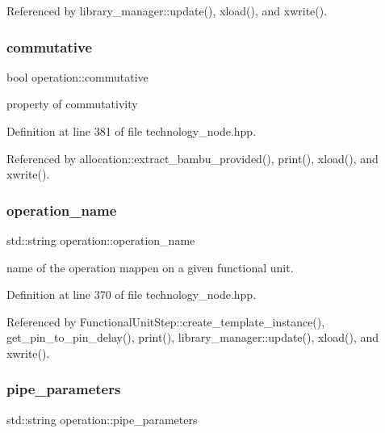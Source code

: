 Referenced by library\+\_\+manager\+::update(), xload(), and xwrite().

\mbox{\label{structoperation_aa872c8588602ccb6d412b9d164eef46c}} 
\subsubsection{\texorpdfstring{commutative}{commutative}}
{\footnotesize\ttfamily bool operation\+::commutative}



property of commutativity 



Definition at line 381 of file technology\+\_\+node.\+hpp.



Referenced by allocation\+::extract\+\_\+bambu\+\_\+provided(), print(), xload(), and xwrite().

\mbox{\label{structoperation_af5a268de2cc56a57805b2e316349dccd}} 
\subsubsection{\texorpdfstring{operation\+\_\+name}{operation\_name}}
{\footnotesize\ttfamily std\+::string operation\+::operation\+\_\+name}



name of the operation mappen on a given functional unit. 



Definition at line 370 of file technology\+\_\+node.\+hpp.



Referenced by Functional\+Unit\+Step\+::create\+\_\+template\+\_\+instance(), get\+\_\+pin\+\_\+to\+\_\+pin\+\_\+delay(), print(), library\+\_\+manager\+::update(), xload(), and xwrite().

\mbox{\label{structoperation_ab5eaece9cc865e43adaa75df83b5b4f3}} 
\subsubsection{\texorpdfstring{pipe\+\_\+parameters}{pipe\_parameters}}
{\footnotesize\ttfamily std\+::string operation\+::pipe\+\_\+parameters}



